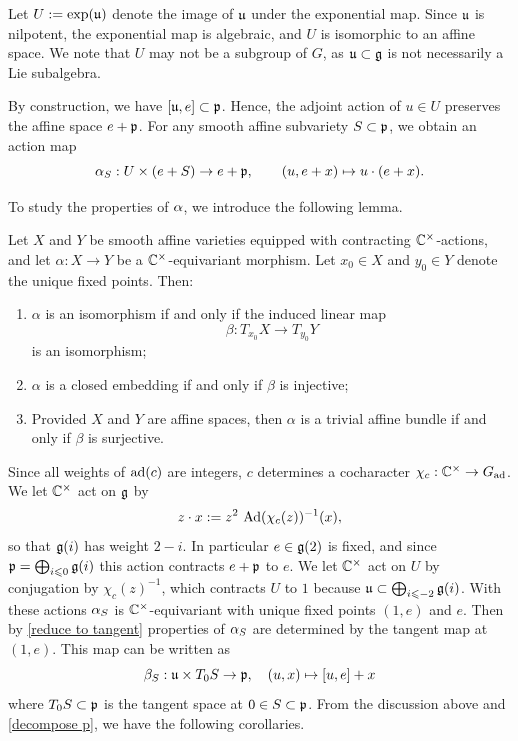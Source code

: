 \documentclass[11pt]{article}
\numberwithin{equation}{section}
\begin{document}
Let $U:=\exp(\mathfrak{u})$ denote the image of $\mathfrak{u}$ under the exponential map. Since $\mathfrak{u}$ is nilpotent, the exponential map is algebraic, and $U$ is isomorphic to an affine space. We note that $U$ may not be a subgroup of $G$, as $\mathfrak{u}\subset\mathfrak{g}$ is not necessarily a Lie subalgebra. 

By construction, we have $[\mathfrak{u},e]\subset \mathfrak{p}$. Hence, the adjoint action of $u\in U$ preserves the affine space $e+\mathfrak{p}$. For any smooth affine subvariety $S\subset \mathfrak{p}$, we obtain an action map
\begin{equation}\label{action map}
\alpha_S:U\times (e+S)\to e+\mathfrak{p},\qquad (u,e+x)\mapsto u\cdot (e+x).
\end{equation}

To study the properties of $\alpha$, we introduce the following lemma. 
\begin{lem}[\cite{GG2002}]\label{reduce to tangent}
Let $X$ and $Y$ be smooth affine varieties equipped with contracting
$\mathbb{C}^\times$-actions, and let
$\alpha\colon X \to Y$
be a $\mathbb{C}^\times$-equivariant morphism.
Let $x_0\in X$ and $y_0\in Y$ denote the unique fixed points.
Then:
\begin{enumerate}
\item $\alpha$ is an isomorphism if and only if the induced linear map
\[
\beta\colon T_{x_0}X \to T_{y_0}Y
\]
is an isomorphism;

\item $\alpha$ is a closed embedding if and only if $\beta$ is injective;

\item Provided $X$ and $Y$ are affine spaces, then $\alpha$ is a trivial affine bundle if and only if $\beta$ is surjective.
\end{enumerate}
\end{lem}
Since all weights of $\operatorname{ad}(c)$ are integers, $c$ determines a cocharacter
$\chi_c:\mathbb{C}^\times\to G_{\mathrm{ad}}$. We let $\mathbb{C}^\times$ act on $\mathfrak{g}$ by
\[
z\cdot x := z^{2}\,\operatorname{Ad}(\chi_c(z))^{-1}(x),
\]
so that $\mathfrak{g}(i)$ has weight $2-i$. In particular $e\in\mathfrak{g}(2)$ is fixed, and since
$\mathfrak{p}=\bigoplus_{i\leqslant 0}\mathfrak{g}(i)$ this action contracts $e+\mathfrak{p}$ to $e$. We let
$\mathbb{C}^\times$ act on $U$ by conjugation by $\chi_c(z)^{-1}$, which contracts $U$ to
$1$ because $\mathfrak{u}\subset\bigoplus_{i\leqslant -2}\mathfrak{g}(i)$. With these actions
$\alpha_S$ is $\mathbb{C}^\times$-equivariant with unique fixed points $(1,e)$ and $e$. Then
by \cref{reduce to tangent} properties of $\alpha_S$ are determined by the tangent map at
$(1,e)$. This map can be written as
\begin{equation}\label{tangent action map}
  \beta_S: \mathfrak{u}\times T_0 S \rightarrow \mathfrak{p}, \quad (u,x)\mapsto [u,e]+x  
\end{equation}
where $T_0 S\subset \mathfrak{p}$ is the tangent space at $0\in S\subset \mathfrak{p}$. From the discussion above and \cref{decompose p}, we have the following corollaries.
\end{document}

